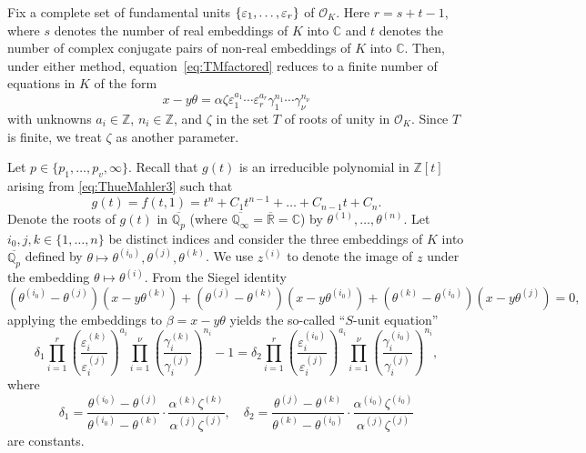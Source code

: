 Fix a complete set of fundamental units $\{\varepsilon_1, \dots, \varepsilon_r\}$ of $\mathcal{O}_K$. Here $r = s + t -1$, where $s$ denotes the number of real embeddings of $K$ into $\mathbb{C}$ and $t$ denotes the number of complex conjugate pairs of non-real embeddings of $K$ into $\mathbb{C}$. Then, under either method, equation~\eqref{eq:TMfactored} reduces to a finite number of equations in $K$ of the form
\begin{equation} \label{eq:TMinK}
x-y\theta = \alpha \zeta \varepsilon_1^{a_1} \cdots \varepsilon_r^{a_r}\gamma_1^{n_1}\cdots \gamma_{\nu}^{n_{\nu}}
\end{equation}
with unknowns $a_i \in \mathbb{Z}$, $n_i \in \mathbb{Z}$, and $\zeta$ in the set $T$ of roots of unity in $\mathcal{O}_K$. Since $T$ is finite, we treat $\zeta$ as another parameter. 

Let $p \in \{p_1, \dots, p_v, \infty\}$. Recall that $g(t)$ is an irreducible polynomial in $\mathbb{Z}[t]$ arising from \eqref{eq:ThueMahler3} such that
\[g(t) = f(t,1) = t^n + C_1 t^{n-1} + \dots + C_{n-1}t + C_n.\]
Denote the roots of $g(t)$ in $\overline{\mathbb{Q}_p}$ (where $\overline{\mathbb{Q}_{\infty}} = \overline{\mathbb{R}} = \mathbb{C}$) by $\theta^{(1)}, \dots, \theta^{(n)}$. Let $i_0, j, k \in \{1,\dots, n\}$ be distinct indices and consider the three embeddings of $K$ into $\overline{\mathbb{Q}_p}$ defined by $\theta \mapsto \theta^{(i_0)}, \theta^{(j)}, \theta^{(k)}$. We use $z^{(i)}$ to denote the image of $z$ under the embedding $\theta \mapsto \theta^{(i)}$. From the Siegel identity
\[(\theta^{(i_0)} - \theta^{(j)})(x-y\theta^{(k)}) + (\theta^{(j)} - \theta^{(k)})(x-y\theta^{(i_0)}) + (\theta^{(k)} - \theta^{(i_0)})(x-y\theta^{(j)}) = 0,\]
applying the embeddings to $\beta = x-y\theta$ yields the so-called ``$S$-unit equation''
\begin{equation} \label{eq:Sunit}
\delta_1 \prod_{i = 1}^r\left( \frac{\varepsilon_i^{(k)}}{\varepsilon_i^{(j)}}\right)^{a_i}\prod_{i = 1}^{\nu} \left( \frac{\gamma_i^{(k)}}{\gamma_i^{(j)}}\right)^{n_i} - 1 = \delta_2 \prod_{i = 1}^{r}\left( \frac{\varepsilon_i^{(i_0)}}{\varepsilon_i^{(j)}}\right)^{a_i} \prod_{i = 1}^{\nu} \left( \frac{\gamma_i^{(i_0)}}{\gamma_i^{(j)}}\right)^{n_i},
\end{equation}
where
\[\delta_1 = \frac{\theta^{(i_0)} - \theta^{(j)}}{\theta^{(i_0)} - \theta^{(k)}}\cdot\frac{\alpha^{(k)}\zeta^{(k)}}{\alpha^{(j)}\zeta^{(j)}}, \quad \delta_2 = \frac{\theta^{(j)} - \theta^{(k)}}{\theta^{(k)} - \theta^{(i_0)}}\cdot \frac{\alpha^{(i_0)}\zeta^{(i_0)}}{\alpha^{(j)}\zeta^{(j)}}\]
are constants. 


